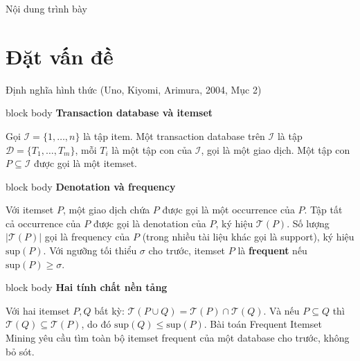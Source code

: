\documentclass[9pt, aspectratio=169]{beamer}
\newenvironment{quietblock}[1]{%
  \begin{beamercolorbox}[wd=\linewidth,sep=5pt,rounded=true]{block body}
  {\color{psdearblue}\bfseries #1}\par\vspace{2pt}\footnotesize
}{%
  \end{beamercolorbox}
}
\newcommand{\key}[1]{\textcolor{psdearblue}{\textbf{#1}}}
\begin{document}
\begin{frame}{Nội dung trình bày}
  \tableofcontents
\end{frame}

\section{Đặt vấn đề}
\begin{frame}{Định nghĩa hình thức (Uno, Kiyomi, Arimura, 2004, Mục 2)}
  \begin{quietblock}{Transaction database và itemset}
    Gọi $\mathcal I=\{1,\ldots,n\}$ là tập item. Một transaction database
    trên $\mathcal I$ là tập $\mathcal D=\{T_1,\ldots,T_m\}$, mỗi $T_i$ là
    một tập con của $\mathcal I$, gọi là một giao dịch. Một tập con
    $P\subseteq\mathcal I$ được gọi là một itemset.
  \end{quietblock}

  \vspace{0.2cm}
  \begin{quietblock}{Denotation và frequency}
    Với itemset $P$, một giao dịch chứa $P$ được gọi là một occurrence của
    $P$. Tập tất cả occurrence của $P$ được gọi là denotation của $P$, ký
    hiệu $\mathcal T(P)$. Số lượng $|\mathcal T(P)|$ gọi là frequency của
    $P$ (trong nhiều tài liệu khác gọi là support), ký hiệu
    $\mathrm{sup}(P)$. Với ngưỡng tối thiểu $\sigma$ cho trước, itemset $P$
    là \key{frequent} nếu $\mathrm{sup}(P)\geq\sigma$.
  \end{quietblock}

  \vspace{0.2cm}
  \begin{quietblock}{Hai tính chất nền tảng}
    Với hai itemset $P,Q$ bất kỳ: $\mathcal T(P\cup Q)=\mathcal T(P)\cap
    \mathcal T(Q)$. Và nếu $P\subseteq Q$ thì $\mathcal T(Q)\subseteq
    \mathcal T(P)$, do đó $\mathrm{sup}(Q)\leq\mathrm{sup}(P)$. Bài toán
    Frequent Itemset Mining yêu cầu tìm toàn bộ itemset frequent của một
    database cho trước, không bỏ sót.
  \end{quietblock}
\end{frame}
\end{document}
